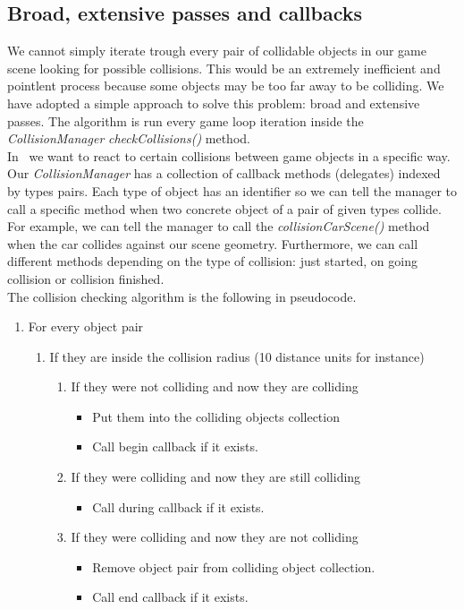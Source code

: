 

\subsection{Broad, extensive passes and callbacks}

We cannot simply iterate trough every pair of collidable objects in our game scene looking
for possible collisions. This would be an extremely inefficient and pointlent process because
some objects may be too far away to be colliding. We have adopted a simple approach to solve
this problem: broad and extensive passes. The algorithm is run every game loop iteration
inside the \textit{CollisionManager} \textit{checkCollisions()} method.\\

In \game\, we want to react to certain collisions between game objects in a specific way.
Our \textit{CollisionManager} has a collection of callback methods (delegates) indexed
by types pairs. Each type of object has an identifier so we can tell the manager to call
a specific method when two concrete object of a pair of given types collide.
For example, we can tell the manager
to call the \textit{collisionCarScene()} method when the car collides against our scene geometry.
Furthermore, we can call different methods depending on the type of collision: just started,
on going collision or collision finished.\\

The collision checking algorithm is the following in pseudocode.

\begin{enumerate}
	\item For every object pair
	\begin{enumerate}
		\item If they are inside the collision radius (10 distance units for instance)
			\begin{enumerate}
				\item If they were not colliding and now they are colliding
				\begin{itemize}
					\item Put them into the colliding objects collection
					\item Call begin callback if it exists.
				\end{itemize}
				\item If they were colliding and now they are still colliding
				\begin{itemize}
					\item Call during callback if it exists.
				\end{itemize}
				\item If they were colliding and now they are not colliding
				\begin{itemize}
					\item Remove object pair from colliding object collection.
					\item Call end callback if it exists.
				\end{itemize}
			\end{enumerate}
	\end{enumerate}
\end{enumerate}

